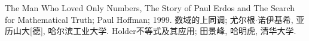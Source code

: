 \begin{thebibliography}{}
  The Man Who Loved Only Numbers, The Story of Paul Erdos and The Search for Mathematical Truth; Paul Hoffman; 1999.
  数域的上同调; 尤尔根$\cdot$诺伊基希, 亚历山大[德], 哈尔滨工业大学.
  Holder不等式及其应用; 田景峰, 哈明虎, 清华大学.
\end{thebibliography}
